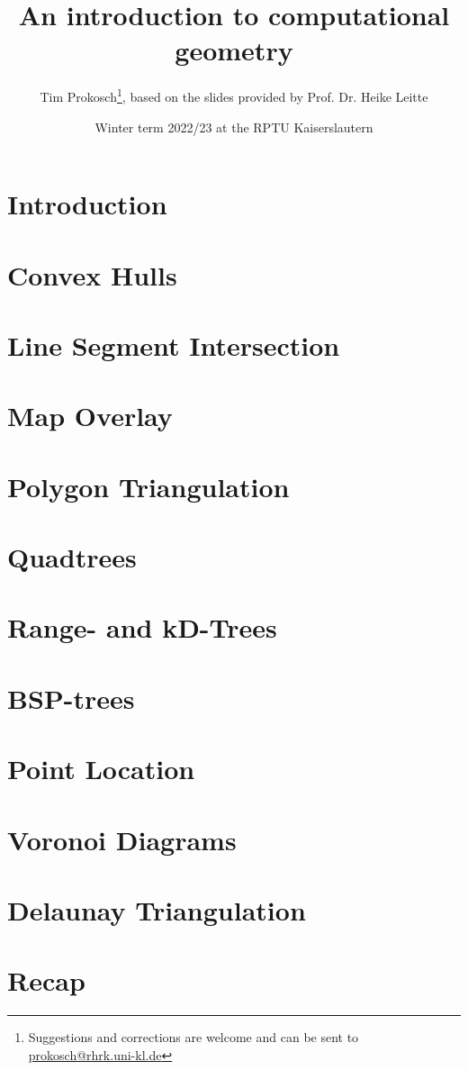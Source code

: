 \documentclass[a4paper, 12pt]{report}
\title{An introduction to computational geometry}
\author{Tim Prokosch\footnote{Suggestions and corrections are welcome and can be sent to \href{mailto:prokosch@rhrk.uni-kl.de}{prokosch@rhrk.uni-kl.de}}, based on the slides provided by Prof. Dr. Heike Leitte}
\date{Winter term 2022/23 at the RPTU Kaiserslautern}
\begin{document}
  \maketitle
  \tableofcontents
  \listofalgorithms

  \chapter{Introduction}
  

  \chapter{Convex Hulls}
  \label{ch:convex_hulls}
  

  \chapter{Line Segment Intersection}
  \label{ch:line_segment_intersection}
  

  \chapter{Map Overlay}
  \label{ch:map_overlay}
  

  \chapter{Polygon Triangulation}
  \label{ch:polygon_triangulation}
  

  \chapter{Quadtrees}
  \label{ch:quadtrees}
  

  \chapter{Range- and kD-Trees}
  \label{ch:range-_and_kd-trees}
  

  \chapter{BSP-trees}
  \label{ch:bsptrees}
  

  \chapter{Point Location}
  \label{ch:point_location}
  

  \chapter{Voronoi Diagrams}
  \label{ch:voronoi_diagrams}
  

  \chapter{Delaunay Triangulation}
  \label{ch:delaunay_triangulation}
  

  \chapter{Recap}
  
\end{document}
